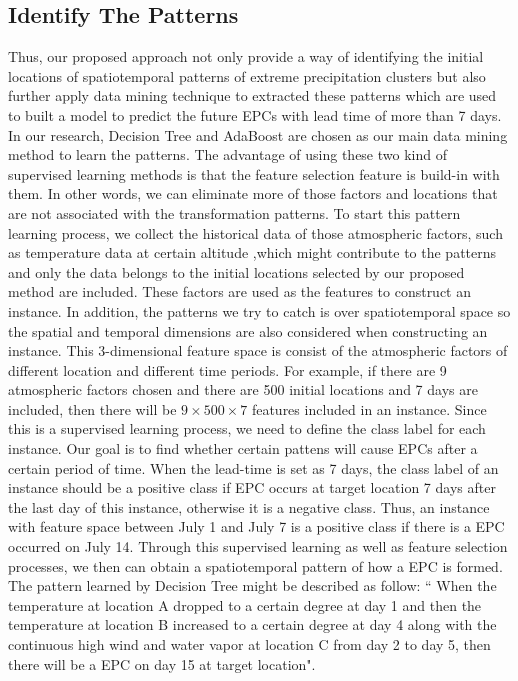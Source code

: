 \documentclass{acm_proc_article-sp}
\begin{document}
\subsection{Identify The Patterns}
\label{sec:patterns}  
Thus, our proposed approach not only provide a way of identifying the initial locations of spatiotemporal patterns of extreme precipitation clusters but also further apply data mining technique to extracted these patterns which are used to built a model to predict the future EPCs with lead time of more than 7 days. In our research, Decision Tree and AdaBoost are chosen as our main data mining method to learn the patterns. The advantage of using these two kind of supervised learning methods is that the feature selection feature is build-in with them. In other words, we can eliminate more of those factors and locations that are not associated with the transformation patterns.
\newline
To start this pattern learning process, we collect the historical data of those atmospheric factors, such as temperature data at certain altitude ,which might contribute to the patterns and only the data belongs to the initial locations selected by our proposed method are included. These factors are used as the features to construct an instance. In addition, the patterns we try to catch is over spatiotemporal space so the spatial and temporal dimensions are also considered when constructing an instance. This 3-dimensional feature space is consist of the atmospheric factors of different location and different time periods. For example, if there are 9 atmospheric factors chosen and there are 500 initial locations and 7 days are included, then there will be $ 9 \times 500 \times 7 $ features included in an instance.
\newline
Since this is a supervised learning process, we need to define the class label for each instance. Our goal is to find whether certain pattens will cause EPCs after a certain period of time. When the lead-time is set as 7 days, the class label of an instance should be a positive class if EPC occurs at target location 7 days after the last day of this instance, otherwise it is a negative class. Thus, an instance with feature space between July 1 and July 7 is a positive class if there is a EPC occurred on July 14.
\newline 
Through this supervised learning as well as feature selection processes, we then can obtain a spatiotemporal pattern of how a EPC is formed. The pattern learned by Decision Tree might be described as follow: `` When the temperature at location A dropped to a certain degree at day 1 and then the temperature at location B increased to a certain degree at day 4 along with the continuous high wind and water vapor at location C from day 2 to day 5, then there will be a EPC on day 15 at target location".  
\end{document}
